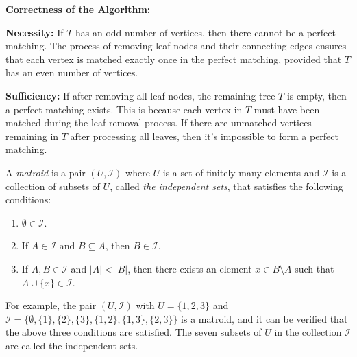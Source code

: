 \documentclass{oxmathproblems}
\begin{document}
\begin{questions}
\textbf{Correctness of the Algorithm:}

\textbf{Necessity:} If $T$ has an odd number of vertices, then there cannot be a perfect matching. The process of removing leaf nodes and their connecting edges ensures that each vertex is matched exactly once in the perfect matching, provided that $T$ has an even number of vertices.
  
\textbf{Sufficiency:} If after removing all leaf nodes, the remaining tree $T$ is empty, then a perfect matching exists. This is because each vertex in $T$ must have been matched during the leaf removal process. If there are unmatched vertices remaining in $T$ after processing all leaves, then it's impossible to form a perfect matching.

\miquestion[25]
A \emph{matroid} is a pair $(U,\mathcal{I})$ where $U$ is a set of finitely many elements and $\mathcal{I}$ is a collection of subsets of $U$, called \emph{the independent sets}, that satisfies the following conditions:
\begin{enumerate}
    \item $\emptyset\in\mathcal{I}$.
    \item If $A\in\mathcal{I}$ and $B\subseteq A$, then $B\in\mathcal{I}$.
    \item If $A,B\in\mathcal{I}$ and $|A|<|B|$, then there exists an element $x\in B\setminus A$ such that $A\cup\{x\}\in\mathcal{I}$.
\end{enumerate}
For example, the pair $(U,\mathcal{I})$ with $U=\{1,2,3\}$ and $\mathcal{I}=\{\emptyset,\{1\},\{2\},\{3\},\{1,2\},\{1,3\},\{2,3\}\}$ is a matroid, and it can be verified that the above three conditions are satisfied.
The seven subsets of $U$ in the collection $\mathcal{I}$ are called the independent sets.

\end{questions}
\end{document}
